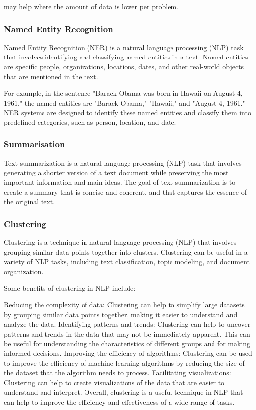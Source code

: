 may help where the amount of data is lower per problem.

\subsubsection{Named Entity Recognition} Named Entity Recognition (NER) is a natural language processing (NLP) task that involves identifying and classifying named entities in a text. Named entities are specific people, organizations, locations, dates, and other real-world objects that are mentioned in the text.

For example, in the sentence "Barack Obama was born in Hawaii on August 4, 1961," the named entities are "Barack Obama," "Hawaii," and "August 4, 1961." NER systems are designed to identify these named entities and classify them into predefined categories, such as person, location, and date.

\subsubsection{Summarisation} Text summarization is a natural language processing (NLP) task that involves generating a shorter version of a text document while preserving the most important information and main ideas. The goal of text summarization is to create a summary that is concise and coherent, and that captures the essence of the original text.

\subsubsection{Clustering} Clustering is a technique in natural language processing (NLP) that involves grouping similar data points together into clusters. Clustering can be useful in a variety of NLP tasks, including text classification, topic modeling, and document organization.

Some benefits of clustering in NLP include:

Reducing the complexity of data: Clustering can help to simplify large datasets by grouping similar data points together, making it easier to understand and analyze the data.
Identifying patterns and trends: Clustering can help to uncover patterns and trends in the data that may not be immediately apparent. This can be useful for understanding the characteristics of different groups and for making informed decisions.
Improving the efficiency of algorithms: Clustering can be used to improve the efficiency of machine learning algorithms by reducing the size of the dataset that the algorithm needs to process.
Facilitating visualizations: Clustering can help to create visualizations of the data that are easier to understand and interpret.
Overall, clustering is a useful technique in NLP that can help to improve the efficiency and effectiveness of a wide range of tasks.



